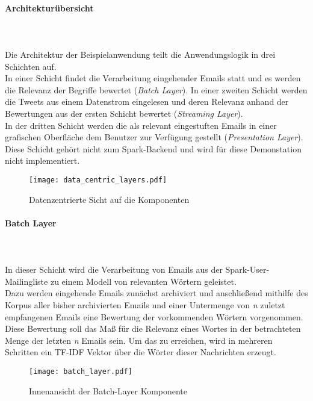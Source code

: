 \paragraph{Architekturübersicht}\\
\\

Die Architektur der Beispielanwendung teilt die Anwendungslogik in drei Schichten auf. \\
In einer Schicht findet die Verarbeitung eingehender Emails statt und es werden die Relevanz der Begriffe bewertet (\textit{Batch Layer}).
In einer zweiten Schicht werden die Tweets aus einem Datenstrom eingelesen und deren Relevanz anhand der Bewertungen aus der ersten Schicht bewertet (\textit{Streaming Layer}).\\
In der dritten Schicht werden die als relevant eingestuften Emails in einer grafischen Oberfläche dem Benutzer zur Verfügung gestellt (\textit{Presentation Layer}). Diese Schicht gehört nicht zum Spark-Backend und wird für diese Demonstation nicht implementiert.

\begin{figure}[ht!]
	\centering
  \texttt{[image: data\_centric\_layers.pdf]}
	\caption{Datenzentrierte Sicht auf die Komponenten}
	\label{figure:data_centric_layers}
\end{figure}

\paragraph{Batch Layer}\\
\\

In dieser Schicht wird die Verarbeitung von Emails aus der Spark-User-Mailingliste zu einem Modell von relevanten Wörtern geleistet.\\

Dazu werden eingehende Emails zunächst archiviert und anschließend mithilfe des Korpus aller bisher archivierten Emails und einer Untermenge von \textit{n} zuletzt empfangenen Emails eine Bewertung der vorkommenden Wörtern vorgenommen.\\

Diese Bewertung soll das Maß für die Relevanz eines Wortes in der betrachteten Menge der letzten \textit{n} Emails sein. Um das zu erreichen, wird in mehreren Schritten ein TF-IDF Vektor über die Wörter dieser Nachrichten erzeugt.\\

\begin{figure}[ht!]
	\centering
  \texttt{[image: batch\_layer.pdf]}
	\caption{Innenansicht der Batch-Layer Komponente}
	\label{figure:demo_app_batchlayer}
\end{figure}

